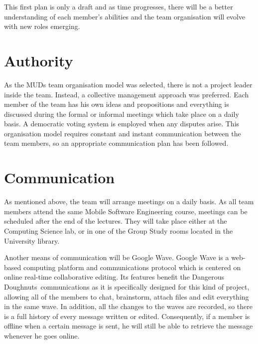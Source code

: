 \documentclass{article}
\newcommand{\dnd}{Dangerous Doughnuts}
\begin{document}
This first plan is only a draft and as time progresses, there will be a better understanding of each member's abilities and the team organisation will evolve with new roles emerging. 


\section{Authority}
\label{auth}

As the MUDs team organisation model was selected, there is not a project leader inside the team. Instead, a collective management approach was preferred. Each member of the team has his own ideas and propositions and everything is discussed during the formal or informal meetings which take place on a daily basis. A democratic voting system is employed when any disputes arise. This organisation model requires constant and instant communication between the team members, so an appropriate communication plan has been followed.


\section{Communication}
\label{com}

As mentioned above, the team will arrange meetings on a daily basis. As all team members attend the same Mobile Software Engineering course, meetings can be scheduled after the end of the lectures. They will take place either at the Computing Science lab, or in one of the Group Study rooms located in the University library.

Another means of communication will be Google Wave. Google Wave is a web-based computing platform and communications protocol which is centered on online real-time collaborative editing. Its features benefit the \dnd\ communications as it is specifically designed for this kind of project, allowing all of the members to chat, brainstorm, attach files and edit everything in the same wave. In addition, all the changes to the waves are recorded, so there is a full history of every message written or edited. Consequently, if a member is offline when a certain message is sent, he will still be able to retrieve the message whenever he goes online.

\end{document}
